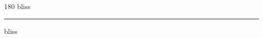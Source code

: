 
\begin{frame}
\begin{center}
\begin{turn}{180}
{\fontsize{2.5cm}{1em}\selectfont bliss}
\end{turn}
\vspace{1em}\par  
\hrule
\vspace{1em}\par  
{\fontsize{2.5cm}{1em}\selectfont bliss}
\end{center}
\end{frame}
